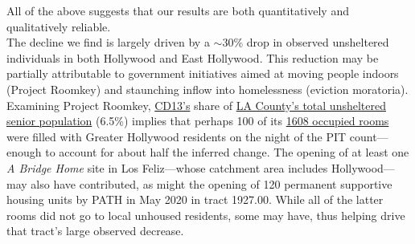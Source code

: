 \documentclass[11pt]{article}
\def\bfr{\bf\color{red}}
\begin{document}
%
%
%


All of the above suggests that our results are both quantitatively and qualitatively reliable.\\

 The decline we find is largely driven by a $\sim$30\% drop in observed 
unsheltered individuals in both Hollywood and East Hollywood. This reduction may be partially attributable to 
government initiatives aimed at moving people indoors (Project Roomkey) and staunching inflow into homelessness 
(eviction moratoria). Examining Project Roomkey, \href{https://www.lahsa.org/documents?id=4672-2020-homeless-count-council-district-13}
{CD13's} share of \href{https://www.lahsa.org/documents?id=4585-2020-greater-los-angeles-homeless-count-los-angeles-continuum-of-care-coc-}{LA County's total unsheltered senior population} (6.5\%) implies that perhaps 100 of its 
\href{https://projectroomkeytracker.com/}{1608 occupied rooms} were filled with Greater Hollywood 
residents on the night of the PIT count---enough to account for about half the inferred change. 
The opening of at least one {\it A Bridge Home} site in Los Feliz---whose catchment area includes Hollywood---may 
also have contributed, as might the opening of 120 permanent supportive housing units by PATH in May 2020 
in tract 1927.00. While all of the latter rooms did not go to local unhoused residents, some may have, thus 
helping drive that tract's large observed decrease. 
\end{document}
